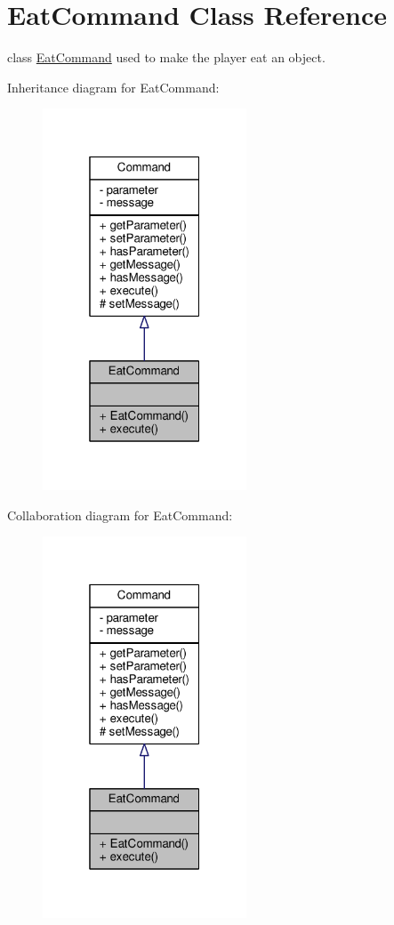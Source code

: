 \hypertarget{classEatCommand}{\section{Eat\-Command Class Reference}
\label{classEatCommand}
}


class \hyperlink{classEatCommand}{Eat\-Command} used to make the player eat an object.  




Inheritance diagram for Eat\-Command\-:
\nopagebreak
\begin{figure}[H]
\begin{center}
\leavevmode
\includegraphics[width=172pt]{classEatCommand__inherit__graph}
\end{center}
\end{figure}


Collaboration diagram for Eat\-Command\-:
\nopagebreak
\begin{figure}[H]
\begin{center}
\leavevmode
\includegraphics[width=172pt]{classEatCommand__coll__graph}
\end{center}
\end{figure}
